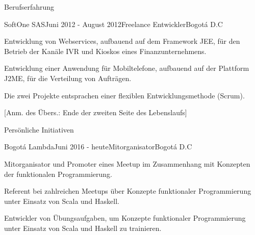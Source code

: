 \documentclass[spanish]{resume} %
\begin{document}
\begin{rSection}{Berufserfahrung}

\begin{rSubsection}{SoftOne SAS}{Juni 2012 - August 2012}{Freelance Entwickler}{Bogot\'a D.C}
\item Entwicklung von Webservices, aufbauend auf dem Framework JEE, für den Betrieb der Kanäle IVR und Kioskos eines Finanzunternehmens.
\item Entwicklung einer Anwendung f{\"u}r Mobiltelefone, aufbauend auf der Plattform J2ME, für die Verteilung von Auftr{\"a}gen.
\item Die zwei Projekte entsprachen einer flexiblen Entwicklungsmethode (Scrum).
\end{rSubsection}

[Anm. des Übers.: Ende der zweiten Seite des Lebenslaufs]

\end{rSection}


\begin{rSection}{Pers{\"o}nliche Initiativen}

\begin{rSubsection}{Bogot\'a Lambda}{Juni 2016 - heute}{Mitorganisator}{Bogot\'a D.C}
\item Mitorganisator und Promoter eines Meetup im Zusammenhang mit Konzepten der funktionalen Programmierung.
\item Referent bei zahlreichen Meetups {\"u}ber Konzepte funktionaler Programmierung unter Einsatz von Scala und Haskell.
\item Entwickler von {\"U}bungsaufgaben, um Konzepte funktionaler Programmierung unter Einsatz von Scala und Haskell zu trainieren.
\end{rSubsection}

\end{rSection}

\end{document}
